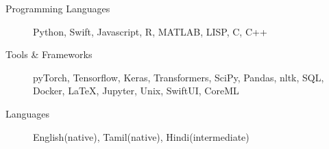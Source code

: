 \begin{description}
\item[Programming Languages] Python, Swift, Javascript, R, MATLAB, LISP, C, C++

\item[Tools \& Frameworks] pyTorch, Tensorflow, Keras, Transformers, SciPy, Pandas, nltk, SQL, Docker, \LaTeX, Jupyter, Unix, SwiftUI, CoreML

\item[Languages] English(native), Tamil(native), Hindi(intermediate)
\end{description}
